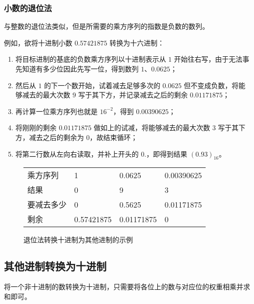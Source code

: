         \subsubsection{小数的退位法}\label{subsubsec:NumberSystemBasics/positional-notation-conversion/from-decimal/fractal-descending-subtraction}

            与整数的退位法类似，但是所需要的乘方序列的指数是负数的数列。

            例如，欲将十进制小数 $0.57421875$ 转换为十六进制：

            \begin{enumerate}
                \item 将目标进制的基底的负数乘方序列以十进制表示从 $1$ 开始往右写，由于无法事先知道有多少位因此先写一位，得到数列 $1$、$0.0625$；
                \item 然后从 $1$ 的下一个数开始，试着减去足够多次的 $0.0625$ 但不变成负数，将能够减去的最大次数 $9$ 写于其下方，并记录减去之后的剩余 $0.01171875$；
                \item 再计算一位乘方序列也就是 $16^{-2}$，得到 $0.00390625$；
                \item 将刚刚的剩余 $0.01171875$ 做如上的试减，将能够减去的最大次数 $3$ 写于其下方，减去之后的剩余为 $0$，故结束循环；
                \item 将第二行数从左向右读取，并补上开头的 $0.$，即得到结果 $(0.93)_{16}$。
            \end{enumerate}

            \begin{figure}
                \centering
                \begin{tabular}{llll}
                    乘方序列   & 1          & 0.0625     & 0.00390625 \\
                    结果       & 0          &          9 &          3 \\ \hline
                    要减去多少 & 0          & 0.5625     & 0.01171875 \\
                    剩余       & 0.57421875 & 0.01171875 & 0
                \end{tabular}
                \caption{退位法转换十进制为其他进制的示例}
                \label{fig:NumberSystemBasics/positional-notation-conversion/from-decimal/fractal-descending-subtraction}
            \end{figure}
    \subsection{其他进制转换为十进制}\label{subsec:NumberSystemBasics/positional-notation-conversion/to-decimal}
        将一个非十进制的数转换为十进制，只需要将各位上的数与对应位的权重相乘并求和即可。

